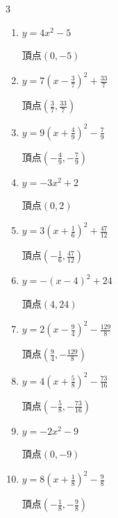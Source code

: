 \begin{multicols}{3}
\begin{enumerate}
        $\displaystyle 頂点\left( -\frac{1}{4} , -\frac{1}{2} \right)$

  \item $\displaystyle y=4x^{2}-5$

        $\displaystyle 頂点\left( 0 , -5 \right)$

\columnbreak %

  \item $\displaystyle y=7\left( x-\frac{3}{7}\right)^{2}+\frac{33}{7}$

        $\displaystyle 頂点\left( \frac{3}{7} , \frac{33}{7} \right)$

  \item $\displaystyle y=9\left( x+\frac{4}{9}\right)^{2}-\frac{7}{9}$

        $\displaystyle 頂点\left( -\frac{4}{9} , -\frac{7}{9} \right)$

  \item $\displaystyle y=-3x^{2}+2$

        $\displaystyle 頂点\left( 0 , 2 \right)$

  \item $\displaystyle y=3\left( x+\frac{1}{6}\right)^{2}+\frac{47}{12}$

        $\displaystyle 頂点\left( -\frac{1}{6} , \frac{47}{12} \right)$

  \item $\displaystyle y=-\left( x-4\right)^{2}+24$

        $\displaystyle 頂点\left( 4 , 24 \right)$

  \item $\displaystyle y=2\left( x-\frac{9}{4}\right)^{2}-\frac{129}{8}$

        $\displaystyle 頂点\left( \frac{9}{4} , -\frac{129}{8} \right)$

  \item $\displaystyle y=4\left( x+\frac{5}{8}\right)^{2}-\frac{73}{16}$

        $\displaystyle 頂点\left( -\frac{5}{8} , -\frac{73}{16} \right)$

  \item $\displaystyle y=-2x^{2}-9$

        $\displaystyle 頂点\left( 0 , -9 \right)$

  \item $\displaystyle y=8\left( x+\frac{1}{8}\right)^{2}-\frac{9}{8}$

        $\displaystyle 頂点\left( -\frac{1}{8} , -\frac{9}{8} \right)$


\end{enumerate}
\end{multicols}
